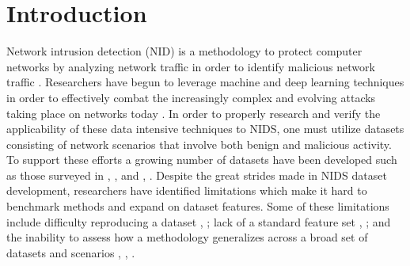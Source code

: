\documentclass[sigconf]{acmart}
\begin{document}
\section{Introduction}
Network intrusion detection (NID) is a methodology to protect computer networks by analyzing network traffic in order to identify malicious network traffic \cite{Chou2022}.
Researchers have begun to leverage machine and deep learning techniques in order to effectively combat the increasingly complex and evolving attacks taking place on networks today \cite{yang2022systematic}.
In order to properly research and verify the applicability of these data intensive techniques to NIDS, one must utilize datasets consisting of network scenarios that involve both benign and malicious activity.
To support these efforts a growing number of datasets have been developed such as those surveyed in \cite{Chou2022}, \cite{yang2022systematic}, and \cite{ring2019survey}, .
Despite the great strides made in NIDS dataset development, researchers have identified limitations which make it hard to benchmark methods and expand on dataset features.
Some of these limitations include difficulty reproducing a dataset \cite{Chou2022}, \cite{ferriyan2021}; lack of a standard feature set \cite{sarhan_arxiv2021}, \cite{Sarhan2021}; and the inability to assess how a methodology generalizes across a broad set of datasets and scenarios \cite{sarhan2020netflow}, \cite{Sarhan2021}, \cite{wolsing2021ipal}.
\end{document}
